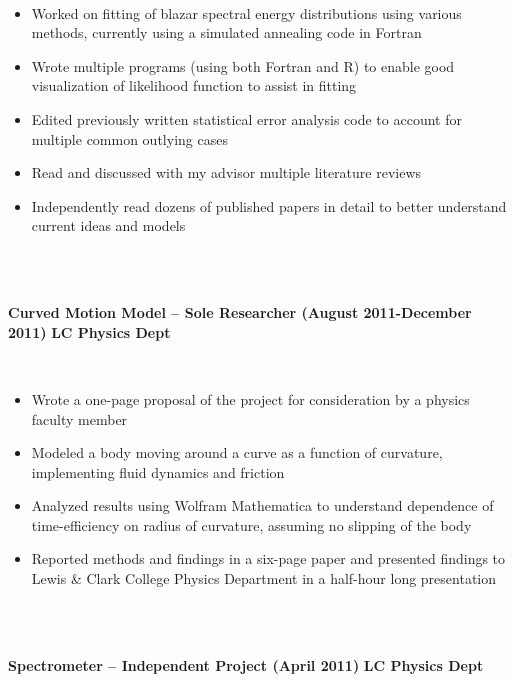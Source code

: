 \documentclass{article}
\begin{document}
\phantom \\
\begin{itemize}
\item Worked on fitting of blazar spectral energy distributions using various methods, currently using a simulated annealing code in Fortran
\item Wrote multiple programs (using both Fortran and R) to enable good visualization of likelihood function to assist in fitting
\item Edited previously written statistical error analysis code to account for multiple common outlying cases
\item Read and discussed with my advisor multiple literature reviews
\item Independently read dozens of published papers in detail to better understand current ideas and models
\end{itemize}
\phantom \\
\phantom \\
%
%
%
%
\begin{vwcol}[widths={0.8,0.2}, sep=.8cm, justify=flush, rule=0pt, indent=0em]
\noindent \textbf{Curved Motion Model – Sole Researcher (August 2011-December 2011)}
\newpage
\noindent \textbf{LC Physics Dept}
\end{vwcol}
\phantom \\
\begin{itemize}
\item Wrote a one-page proposal of the project for consideration by a physics faculty member
\item Modeled a body moving around a curve as a function of curvature, implementing fluid dynamics and friction
\item Analyzed results using Wolfram Mathematica to understand dependence of time-efficiency on radius of curvature, assuming no slipping of the body
\item Reported methods and findings in a six-page paper and presented findings to Lewis \& Clark College Physics Department in a half-hour long presentation
\end{itemize}
\phantom \\
\phantom \\
%
%
%
%
\begin{vwcol}[widths={0.8,0.2}, sep=.8cm, justify=flush, rule=0pt, indent=0em]
\noindent \textbf{Spectrometer – Independent Project (April 2011)}
\newpage
\noindent \textbf{LC Physics Dept}
\end{vwcol}
\phantom \\
\end{document}
